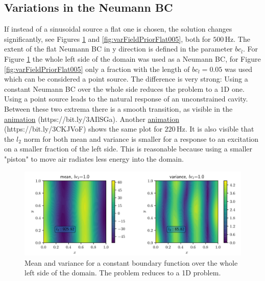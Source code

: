 \documentclass[%
  a4paper,oneside,%
  11pt,%
  smallchapters,
  style=printdev,
  extramargin,
  green,%
  rgb, <cmyk>
  ]{tubsbook}
\begin{document}
\subsection{Variations in the Neumann BC}
If instead of a sinusoidal source a flat one is chosen, the solution changes significantly, see Figures \ref{fig:varFieldPriorFlat1} and \ref{fig:varFieldPriorFlat005}, both for $500\,\mathrm{Hz}$. The extent of the flat Neumann BC in y direction is defined in the parameter $bc_l$. For Figure \ref{fig:varFieldPriorFlat1} the whole left side of the domain was used as a Neumann BC, for Figure \ref{fig:varFieldPriorFlat005} only a fraction with the length of $bc_l = 0.05$ was used which can be considered a point source.
The difference is very strong: Using a constant Neumann BC over the whole side reduces the problem to a 1D one. Using a point source leads to the natural response of an unconstrained cavity. Between these two extrema there is a smooth transition, as visible in the  \href{https://github.com/herluc/Masterarbeit/blob/master/MA_LucasHermann/Python/Results/2D/VaryingSource/SourceVar500Hz_Constant.gif}{animation} (https://bit.ly/3AIlSGa). Another \href{https://github.com/herluc/Masterarbeit/blob/master/MA_LucasHermann/Python/Results/2D/VaryingSource/SourceVar220Hz_Constant.gif}{animation} (https://bit.ly/3CKJVoF) shows the same plot for $220\,\mathrm{Hz}$. It is also visible that the $l_2$ norm for both mean and variance is smaller for a response to an excitation on a smaller fraction of the left side. This is reasonable because using a smaller "piston" to move air radiates less energy into the domain.

\begin{figure}[!ht]
\includegraphics[width=1\textwidth]{../../Python/Results/2D/VaryingSource/y_1/MeanVar.pdf}
\centering
\caption{Mean and variance for a constant boundary function over the whole left side of the domain. The problem reduces to a 1D problem.}
\label{fig:varFieldPriorFlat1}
\end{figure}
%
\end{document}

